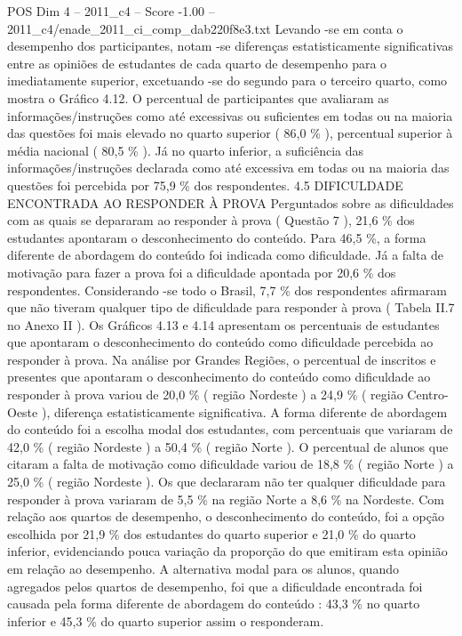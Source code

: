 \begin{textsample}{POS Dim 4 – 2011\_c4 – Score -1.00 – 2011\_c4/enade\_2011\_ci\_comp\_dab220f8e3.txt}
Levando -se em conta o desempenho dos participantes, notam -se diferenças estatisticamente significativas entre as opiniões de estudantes de cada quarto de desempenho para o imediatamente superior, excetuando -se do segundo para o terceiro quarto, como mostra o Gráfico 4.12.
O percentual de participantes que avaliaram as informações/instruções como até excessivas ou suficientes em todas ou na maioria das questões foi mais elevado no quarto superior ( 86,0 \% ), percentual superior à média nacional ( 80,5 \% ).
Já no quarto inferior, a suficiência das informações/instruções declarada como até excessiva em todas ou na maioria das questões foi percebida por 75,9 \% dos respondentes. 4.5 DIFICULDADE ENCONTRADA AO RESPONDER À PROVA Perguntados sobre as dificuldades com as quais se depararam ao responder à prova ( Questão 7 ), 21,6 \% dos estudantes apontaram o desconhecimento do conteúdo.
Para 46,5 \%, a forma diferente de abordagem do conteúdo foi indicada como dificuldade.
Já a falta de motivação para fazer a prova foi a dificuldade apontada por 20,6 \% dos respondentes.
Considerando -se todo o Brasil, 7,7 \% dos respondentes afirmaram que não tiveram qualquer tipo de dificuldade para responder à prova ( Tabela II.7 no Anexo II ).
Os Gráficos 4.13 e 4.14 apresentam os percentuais de estudantes que apontaram o desconhecimento do conteúdo como dificuldade percebida ao responder à prova.
Na análise por Grandes Regiões, o percentual de inscritos e presentes que apontaram o desconhecimento do conteúdo como dificuldade ao responder à prova variou de 20,0 \% ( região Nordeste ) a 24,9 \% ( região Centro-Oeste ), diferença estatisticamente significativa.
A forma diferente de abordagem do conteúdo foi a escolha modal dos estudantes, com percentuais que variaram de 42,0 \% ( região Nordeste ) a 50,4 \% ( região Norte ).
O percentual de alunos que citaram a falta de motivação como dificuldade variou de 18,8 \% ( região Norte ) a 25,0 \% ( região Nordeste ).
Os que declararam não ter qualquer dificuldade para responder à prova variaram de 5,5 \% na região Norte a 8,6 \% na Nordeste.
Com relação aos quartos de desempenho, o desconhecimento do conteúdo, foi a opção escolhida por 21,9 \% dos estudantes do quarto superior e 21,0 \% do quarto inferior, evidenciando pouca variação da proporção do que emitiram esta opinião em relação ao desempenho.
A alternativa modal para os alunos, quando agregados pelos quartos de desempenho, foi que a dificuldade encontrada foi causada pela forma diferente de abordagem do conteúdo : 43,3 \% no quarto inferior e 45,3 \% do quarto superior assim o responderam.

\end{textsample}
